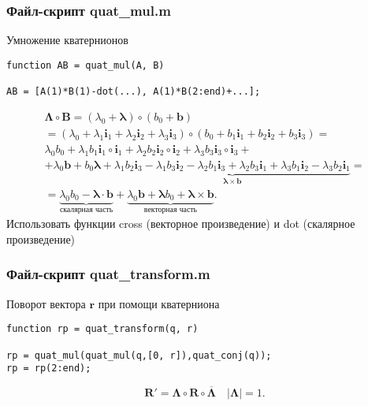 \documentclass[12pt, compress]{beamer}
\renewcommand{\emph}[1]{\textcolor{dark-blue}{#1}}
\begin{document}
\begin{frame}[c, fragile]
\frametitle{Файл-скрипт \emph{quat\_mul.m}}
Умножение кватернионов
\begin{lstlisting}
function AB = quat_mul(A, B)

AB = [A(1)*B(1)-dot(...), A(1)*B(2:end)+...];

\end{lstlisting}
\begin{multline*} 
  \boldsymbol{\Lambda} \circ \boldsymbol{B} = (\lambda_0+{\pmb{\lambda}}) \circ (b_0+ {\boldsymbol{b}}) \\ 
= (\lambda_0 + \lambda_1 \boldsymbol i_1 + \lambda_2 \boldsymbol i_2 + \lambda_3 \boldsymbol i_3) \circ (b_0 + b_1 \boldsymbol i_1 + b_2 \boldsymbol i_2 + b_3 \boldsymbol i_3) = \\
\lambda_0 b_0 + \lambda_1 b_1 \boldsymbol i_1 \circ \boldsymbol i_1 + \lambda_2 b_2 \boldsymbol i_2 \circ \boldsymbol i_2 + \lambda_3 b_3 \boldsymbol i_3 \circ \boldsymbol i_3 + \\
+ \lambda_0 \boldsymbol b + b_0 \boldsymbol \lambda + \underbrace{\lambda_1 b_2 \boldsymbol i_3 - \lambda_1 b_3 \boldsymbol i_2 - \lambda_2 b_1 \boldsymbol i_3 + \lambda_2 b_3 \boldsymbol i_1 + \lambda_3 b_1 \boldsymbol i_2 - \lambda_3 b_2 \boldsymbol i_1}_{\pmb \lambda \times \boldsymbol b} = \\
= \underbrace{\lambda_0 b_0 - \pmb \lambda \cdot \boldsymbol b}_{\text{скалярная часть}} + \underbrace{\lambda_0 \boldsymbol b + \pmb \lambda b_0 + \pmb \lambda \times \boldsymbol b}_{\text{векторная часть}}.
\end{multline*}
Использовать функции \emph{cross} (векторное произведение) и \emph{dot} (скалярное произведение)
\end{frame}


\begin{frame}[c, fragile]
\frametitle{Файл-скрипт \emph{quat\_transform.m}}
Поворот вектора $\boldsymbol r$ при помощи кватерниона
\begin{lstlisting}
function rp = quat_transform(q, r)

rp = quat_mul(quat_mul(q,[0, r]),quat_conj(q));
rp = rp(2:end);

\end{lstlisting}
\begin{equation*}\label{eq:quatAd}
  \boxed{\boldsymbol R' = \boldsymbol \Lambda \circ \boldsymbol R \circ \overline{\boldsymbol \Lambda}} \quad |\boldsymbol \Lambda| = 1.
\end{equation*}
\end{frame}
\end{document}
